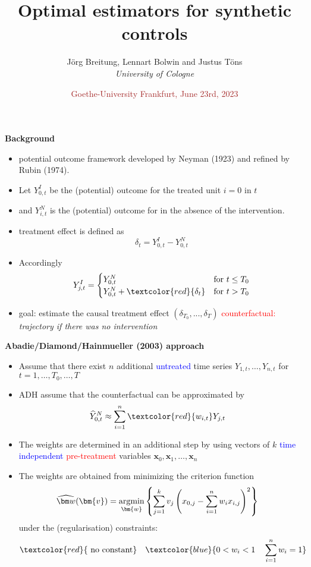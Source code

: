 \documentclass{beamer}
\title{\bf Optimal estimators for synthetic controls}\vspace{1cm}
\author{{{ J\"org Breitung}, Lennart Bolwin  and Justus T\"ons \\[2mm] \textit{University of Cologne }}}
\date[]{ \textcolor{brown}{Goethe-University Frankfurt, June 23rd, 2023 }}
\def\argmin{\mathop{\rm argmin}\limits}
\newcommand{\blue}[1]{\textcolor{blue}{#1}}
\newcommand{\red}[1]{\textcolor{red}{#1}}
\def\argmin{\mathop{\rm argmin}\limits}
\begin{document}
\begin{frame}
  \titlepage
\end{frame}

\begin{frame}{\bf Background}
\begin{itemize}
\item potential outcome framework developed by Neyman (1923) and refined by Rubin (1974).

\item Let $Y^{I}_{0,t}$ be the (potential) outcome for the treated unit $i=0$ in $t$
\item and $Y^{N}_{i,t}$ is the (potential) outcome for in the \alert{absence} of the intervention.

\item treatment effect is defined as
\[
\delta_{t} = Y^{I}_{0,t} - Y^{N}_{0,t}
\]

\item Accordingly
\[
Y_{j,t}^I = \begin{cases}
	Y^{N}_{0,t} &\text{for }  t \le T_0   \\
	Y^{N}_{0,t} + \red{\delta_{t} } &  \text{for  } t > T_0
\end{cases}
\]
\item goal: estimate the causal treatment effect $(\delta_{T_0}, ..., \delta_{T})$  \newline
\red{counterfactual:} {\it trajectory if there was no intervention}
\end{itemize}
\end{frame}

\begin{frame}{\bf Abadie/Diamond/Hainmueller (2003) approach}
\begin{itemize}
\item Assume that there exist $n$ additional \blue{untreated} time series $Y_{1,t},\ldots,Y_{n,t}$ for $t=1,\ldots,T_0,\ldots,T$
\item ADH assume that the counterfactual can be approximated by
\begin{align*}
\widehat Y^{N}_{0,t} &\approx \sum_{i=1}^n \red{w_{i,t}} Y_{j,t}
\end{align*}
\item The weights are determined in an additional step by using vectors of $k$ \blue{time independent} \red{pre-treatment} variables $\bm{x}_0,\bm{x}_1,\ldots,\bm{x}_n$
\item The weights are obtained from minimizing the criterion function
\begin{align*}
\widehat{\bm w}(\bm{v}) &= \argmin_{\bm{w}} \left\{ \sum_{j=1}^k v_j \left( x_{0,j} - \sum_{i=1}^n w_i x_{i,j}\right)^2 \right\}
\end{align*}
under the (regularisation) constraints:
\begin{align*}
 \red{ \text{ no constant} } \quad
 \blue{ 0 < w_i < 1 \quad
 \sum_{i=1}^n w_i = 1 }
\end{align*}
\end{itemize}
\end{frame}
\end{document}
